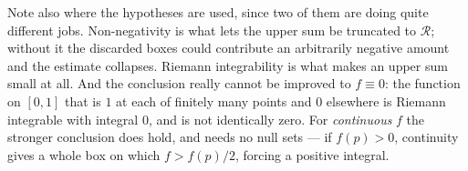 \begin{exercisesolution}
\begin{remark}
Note also where the hypotheses are used, since two of them are doing quite different jobs.
Non-negativity is what lets the upper sum be truncated to $\mathcal{R}$; without it the discarded
boxes could contribute an arbitrarily negative amount and the estimate collapses. Riemann
integrability is what makes an upper sum small at all. And the conclusion really cannot be
improved to $f \equiv 0$: the function on $[0,1]$ that is $1$ at each of finitely many points and
$0$ elsewhere is Riemann integrable with integral $0$, and is not identically zero. For
\emph{continuous} $f$ the stronger conclusion does hold, and needs no null sets --- if
$f(p) > 0$, continuity gives a whole box on which $f > f(p)/2$, forcing a positive integral.
\end{remark}
\end{exercisesolution}

